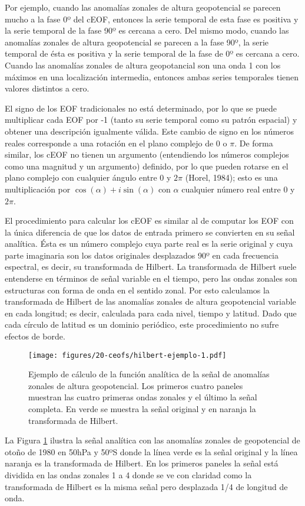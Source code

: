 \documentclass[12pt,oneside]{reedthesis}
\begin{document}
Por ejemplo, cuando las anomalías zonales de altura geopotencial se parecen mucho a la fase 0º del cEOF, entonces la serie temporal de esta fase es positiva y la serie temporal de la fase 90º es cercana a cero.
Del mismo modo, cuando las anomalías zonales de altura geopotencial se parecen a la fase 90º, la serie temporal de ésta es positiva y la serie temporal de la fase de 0º es cercana a cero.
Cuando las anomalías zonales de altura geopotancial son una onda 1 con los máximos en una localización intermedia, entonces ambas series temporales tienen valores distintos a cero.

El signo de los EOF tradicionales no está determinado, por lo que se puede multiplicar cada EOF por -1 (tanto su serie temporal como su patrón espacial) y obtener una descripción igualmente válida.
Este cambio de signo en los números reales corresponde a una rotación en el plano complejo de 0 o \(\pi\).
De forma similar, los cEOF no tienen un argumento (entendiendo los números complejos como una magnitud y un argumento) definido, por lo que pueden rotarse en el plano complejo con cualquier ángulo entre 0 y \(2\pi\) (Horel, 1984); esto es una multiplicación por \(\cos(\alpha) + i\sin(\alpha)\) con \(\alpha\) cualquier número real entre 0 y \(2\pi\).

El procedimiento para calcular los cEOF es similar al de computar los EOF con la única diferencia de que los datos de entrada primero se convierten en su señal analítica.
Ésta es un número complejo cuya parte real es la serie original y cuya parte imaginaria son los datos originales desplazados 90º en cada frecuencia espectral, es decir, su transformada de Hilbert.
La transformada de Hilbert suele entenderse en términos de señal variable en el tiempo, pero las ondas zonales son estructuras con forma de onda en el sentido zonal.
Por esto calculamos la transformada de Hilbert de las anomalías zonales de altura geopotencial variable en cada longitud; es decir, calculada para cada nivel, tiempo y latitud.
Dado que cada círculo de latitud es un dominio periódico, este procedimiento no sufre efectos de borde.




\begin{figure}
\centering
\texttt{[image: figures/20-ceofs/hilbert-ejemplo-1.pdf]}
\caption{\label{fig:hilbert-ejemplo}Ejemplo de cálculo de la función analítica de la señal de anomalías zonales de altura geopotencial.
Los primeros cuatro paneles muestran las cuatro primeras ondas zonales y el último la señal completa.
En verde se muestra la señal original y en naranja la transformada de Hilbert.}
\end{figure}
La Figura \ref{fig:hilbert-ejemplo} ilustra la señal analítica con las anomalías zonales de geopotencial de otoño de 1980 en 50hPa y 50ºS donde la línea verde es la señal original y la línea naranja es la transformada de Hilbert.
En los primeros paneles la señal está dividida en las ondas zonales 1 a 4 donde se ve con claridad como la transformada de Hilbert es la misma señal pero desplazada 1/4 de longitud de onda.
\end{document}

